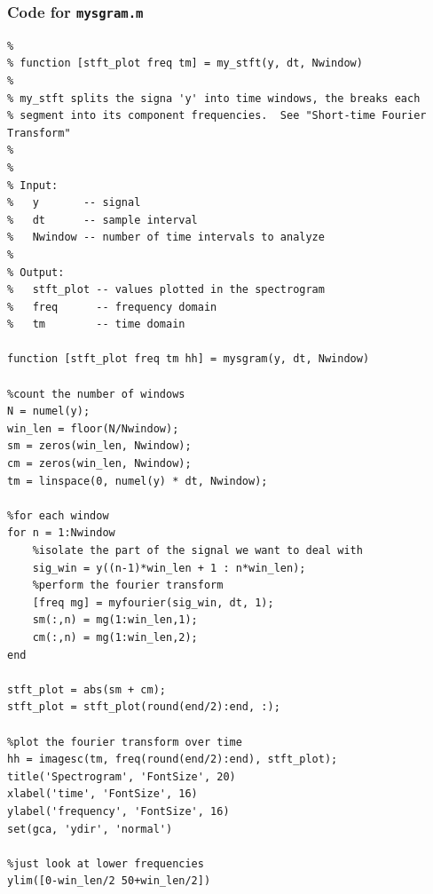 \documentclass{article}
\begin{document}
\subsubsection*{Code for {\tt mysgram.m}}
\begin{verbatim}
%
% function [stft_plot freq tm] = my_stft(y, dt, Nwindow)
%
% my_stft splits the signa 'y' into time windows, the breaks each 
% segment into its component frequencies.  See "Short-time Fourier Transform"
% 
%
% Input: 
%   y       -- signal
%   dt      -- sample interval
%   Nwindow -- number of time intervals to analyze
%
% Output:
%   stft_plot -- values plotted in the spectrogram
%   freq      -- frequency domain
%   tm        -- time domain

function [stft_plot freq tm hh] = mysgram(y, dt, Nwindow)

%count the number of windows
N = numel(y);
win_len = floor(N/Nwindow);
sm = zeros(win_len, Nwindow);
cm = zeros(win_len, Nwindow);
tm = linspace(0, numel(y) * dt, Nwindow);

%for each window
for n = 1:Nwindow 
    %isolate the part of the signal we want to deal with
    sig_win = y((n-1)*win_len + 1 : n*win_len);
    %perform the fourier transform
    [freq mg] = myfourier(sig_win, dt, 1);
    sm(:,n) = mg(1:win_len,1);
    cm(:,n) = mg(1:win_len,2);
end

stft_plot = abs(sm + cm);
stft_plot = stft_plot(round(end/2):end, :);

%plot the fourier transform over time
hh = imagesc(tm, freq(round(end/2):end), stft_plot);
title('Spectrogram', 'FontSize', 20)
xlabel('time', 'FontSize', 16)
ylabel('frequency', 'FontSize', 16)
set(gca, 'ydir', 'normal')

%just look at lower frequencies
ylim([0-win_len/2 50+win_len/2])
\end{verbatim}
\end{document}
